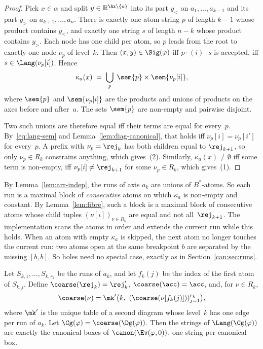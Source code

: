 \begin{proof}
Pick $x\in\alpha$ and split $y\in\mathbb{R}^{\Ax\setminus\{a\}}$ into its part
$y_<$ on $a_1,\dots,a_{k-1}$ and its part $y_>$ on $a_{k+1},\dots,a_n$. There
is exactly one atom string $p$ of length $k-1$ whose product contains $y_<$, and
exactly one string $s$ of length $n-k$ whose product contains $y_>$. Each node
has one child per atom, so $p$ leads from the root to exactly one node $\nu_p$
of level~$k$. Then $(x,y)\in\Sig(\varphi)$ iff $p\cdot(i)\cdot s$ is accepted,
iff $s\in\Lang(\nu_p[i])$. Hence
\[
  \kappa_a(x) \;=\; \bigcup_{p} \;\sem{p}\times\sem{\nu_p[i]},
\]
where $\sem{p}$ and $\sem{\nu_p[i]}$ are the products and unions of products on
the axes before and after~$a$. The sets $\sem{p}$ are non-empty and pairwise
disjoint.

Two such unions are therefore equal iff their terms are equal for every~$p$.
By~\eqref{eq:lang-sem} and Lemma~\ref{lem:diag-canonical}, that holds iff
$\nu_p[i]=\nu_p[i']$ for every~$p$. A prefix with $\nu_p=\rej_k$ has both
children equal to $\rej_{k+1}$, so only $\nu_p\in R_k$ constrains anything,
which gives~(2). Similarly, $\kappa_a(x)\neq\emptyset$ iff some term is
non-empty, iff $\nu_p[i]\neq\rej_{k+1}$ for some $\nu_p\in R_k$, which
gives~(1).
\end{proof}

By Lemma~\ref{lem:arr-indep}, the runs of axis $a_k$ are unions of
$B^*$-atoms. So each run is a maximal block of \emph{consecutive} atoms on
which $\kappa_a$ is non-empty and constant. By Lemma~\ref{lem:fibre}, such a
block is a maximal block of consecutive atoms whose child tuples
$(\nu[i])_{\nu\in R_k}$ are equal and not all~$\rej_{k+1}$. The implementation
scans the atoms in order and extends the current run while this holds. When an
atom with empty $\kappa_a$ is skipped, the next atom no longer touches the
current run: two atoms open at the same breakpoint $b$ are separated by the
missing $[b,b]$. So holes need no special case, exactly as in
Section~\ref{can:sec:runs}.

\begin{proposition}\label{prop:canon-diag}
Let $S_{k,1},\dots,S_{k,r_k}$ be the runs of $a_k$, and let $f_k(j)$ be the
index of the first atom of $S_{k,j}$. Define
$\coarse(\rej_k)=\rej'_k$, $\coarse(\acc)=\acc$, and, for $\nu\in R_k$,
\[
  \coarse(\nu) = \mk'\bigl(k,\ (\coarse(\nu[f_k(j)]))_{j=1}^{r_k}\bigr),
\]
where $\mk'$ is the unique table of a second diagram whose level~$k$ has one
edge per run of $a_k$. Let $\Cg(\varphi) = \coarse(\Dg(\varphi))$. Then the
strings of $\Lang(\Cg(\varphi))$ are exactly the canonical boxes of
$\canon(\Ev(\varphi,0))$, one string per canonical box.
\end{proposition}


